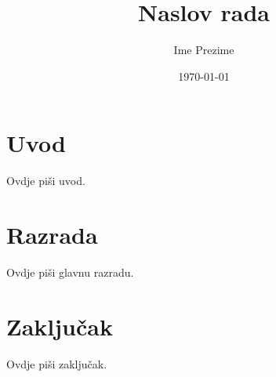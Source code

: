 \documentclass[12pt,a4paper]{article}
\title{Naslov rada}
\author{Ime Prezime}
\date{\today}
\begin{document}
\maketitle

\section{Uvod}

Ovdje piši uvod.

\section{Razrada}

Ovdje piši glavnu razradu.

\section{Zaključak}

Ovdje piši zaključak.



\end{document}
